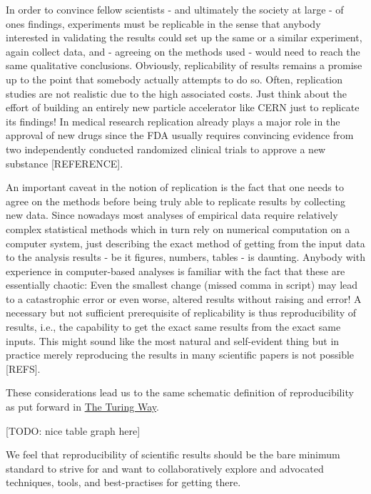 \documentclass[]{book}
\begin{document}
In order to convince fellow scientists - and ultimately the society at
large - of ones findings, experiments must be replicable in the sense
that anybody interested in validating the results could set up the same
or a similar experiment, again collect data, and - agreeing on the
methods used - would need to reach the same qualitative conclusions.
Obviously, replicability of results remains a promise up to the point
that somebody actually attempts to do so. Often, replication studies are
not realistic due to the high associated costs. Just think about the
effort of building an entirely new particle accelerator like CERN just
to replicate its findings! In medical research replication already plays
a major role in the approval of new drugs since the FDA usually requires
convincing evidence from two independently conducted randomized clinical
trials to approve a new substance {[}REFERENCE{]}.

An important caveat in the notion of replication is the fact that one
needs to agree on the methods before being truly able to replicate
results by collecting new data. Since nowadays most analyses of
empirical data require relatively complex statistical methods which in
turn rely on numerical computation on a computer system, just describing
the exact method of getting from the input data to the analysis results
- be it figures, numbers, tables - is daunting. Anybody with experience
in computer-based analyses is familiar with the fact that these are
essentially chaotic: Even the smallest change (missed comma in script)
may lead to a catastrophic error or even worse, altered results without
raising and error! A necessary but not sufficient prerequisite of
replicability is thus reproducibility of results, i.e., the capability
to get the exact same results from the exact same inputs. This might
sound like the most natural and self-evident thing but in practice
merely reproducing the results in many scientific papers is not possible
{[}REFS{]}.

These considerations lead us to the same schematic definition of
reproducibility as put forward in
\href{https://github.com/alan-turing-institute/the-turing-way/blob/master/chapters/reproducibility.md\#the-turing-way-definition-of-reproducibility}{The
Turing Way}.

{[}TODO: nice table graph here{]}

We feel that reproducibility of scientific results should be the bare
minimum standard to strive for and want to collaboratively explore and
advocated techniques, tools, and best-practises for getting there.
\end{document}
